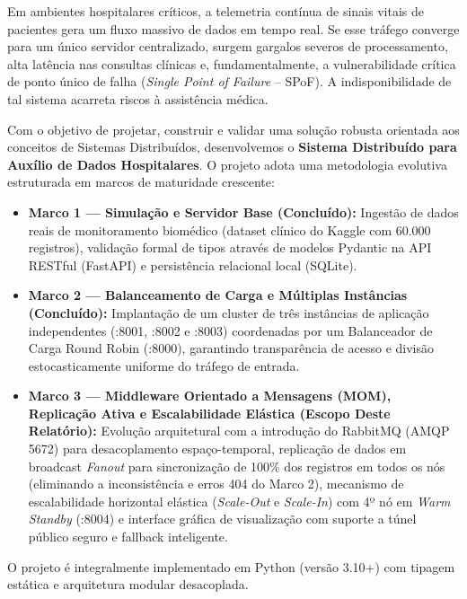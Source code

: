 \documentclass[12pt,a4paper]{article}
\begin{document}
	Em ambientes hospitalares críticos, a telemetria contínua de sinais vitais de pacientes gera um fluxo massivo de dados em tempo real. Se esse tráfego converge para um único servidor centralizado, surgem gargalos severos de processamento, alta latência nas consultas clínicas e, fundamentalmente, a vulnerabilidade crítica de ponto único de falha (\textit{Single Point of Failure} -- SPoF). A indisponibilidade de tal sistema acarreta riscos à assistência médica.
	
	Com o objetivo de projetar, construir e validar uma solução robusta orientada aos conceitos de Sistemas Distribuídos, desenvolvemos o \textbf{Sistema Distribuído para Auxílio de Dados Hospitalares}. O projeto adota uma metodologia evolutiva estruturada em marcos de maturidade crescente:
	
	\begin{itemize}
		\item \textbf{Marco 1 — Simulação e Servidor Base (Concluído):} Ingestão de dados reais de monitoramento biomédico (dataset clínico do Kaggle com 60.000 registros), validação formal de tipos através de modelos Pydantic na API RESTful (FastAPI) e persistência relacional local (SQLite).
		
		\item \textbf{Marco 2 — Balanceamento de Carga e Múltiplas Instâncias (Concluído):} Implantação de um cluster de três instâncias de aplicação independentes (:8001, :8002 e :8003) coordenadas por um Balanceador de Carga Round Robin (:8000), garantindo transparência de acesso e divisão estocasticamente uniforme do tráfego de entrada.
		
		\item \textbf{Marco 3 — Middleware Orientado a Mensagens (MOM), Replicação Ativa e Escalabilidade Elástica (Escopo Deste Relatório):} Evolução arquitetural com a introdução do RabbitMQ (AMQP 5672) para desacoplamento espaço-temporal, replicação de dados em broadcast \textit{Fanout} para sincronização de 100\% dos registros em todos os nós (eliminando a inconsistência e erros 404 do Marco 2), mecanismo de escalabilidade horizontal elástica (\textit{Scale-Out} e \textit{Scale-In}) com 4º nó em \textit{Warm Standby} (:8004) e interface gráfica de visualização com suporte a túnel público seguro e fallback inteligente.
	\end{itemize}
	
	O projeto é integralmente implementado em Python (versão 3.10+) com tipagem estática e arquitetura modular desacoplada.
	
\end{document}

